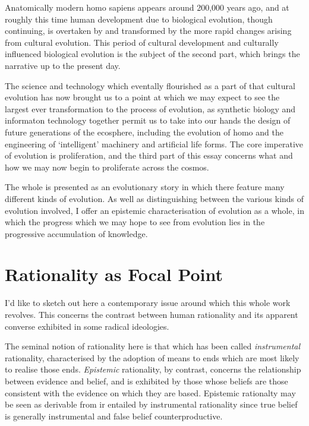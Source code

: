 \documentclass[10pt,titlepage]{book}
\begin{document}
Anatomically modern homo sapiens appears around 200,000 years ago, and at roughly this time human development due to biological evolution, though continuing, is overtaken by and transformed by the more rapid changes arising from cultural evolution.
This period of cultural development and culturally influenced biological evolution is the subject of the second part, which brings the narrative up to the present day.

The science and technology which eventally flourished as a part of that cultural evolution has now brought us to a point at which we may expect to see the largest ever transformation to the process of evolution, as synthetic biology and informaton technology together permit us to take into our hands the design of future generations of the ecosphere, including the evolution of homo and the engineering of `intelligent' machinery and artificial life forms.
The core imperative of evolution is proliferation, and the third part of this essay concerns what and how we may now begin to proliferate across the cosmos.

The whole is presented as an evolutionary story in which there feature many different kinds of evolution.
As well as distinguishing between the various kinds of evolution involved, I offer an epistemic characterisation of evolution as a whole, in which the progress which we may hope to see from evolution lies in the progressive accumulation of knowledge.

\section{Rationality as Focal Point}

I'd like to sketch out here a contemporary issue around which this whole work revolves.
This concerns the contrast between human rationality and its apparent converse exhibited in some radical ideologies.

The seminal notion of rationality here is that which has been called \emph{instrumental} rationality, characterised by the adoption of means to ends which are most likely to realise those ends.
\emph{Epistemic} rationality, by contrast, concerns the relationship between evidence and belief, and is exhibited by those whose beliefs are those consistent with the evidence on which they are based.
Epistemic rationalty may be seen as derivable from ir entailed by instrumental rationality since true belief is generally instrumental and false belief counterproductive.
\end{document}
